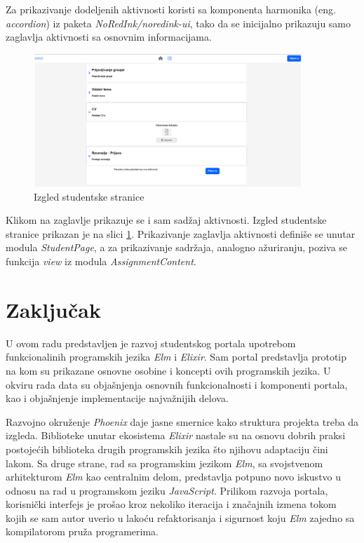 \documentclass[12pt,oneside]{memoir}
\begin{document}
Za prikazivanje dodeljenih aktivnosti koristi sa komponenta harmonika (eng. \emph{accordion}) iz paketa \emph{NoRedInk/noredink-ui},
tako da se inicijalno prikazuju samo zaglavlja aktivnosti sa osnovnim informacijama.
\begin{figure}[!ht]
  \centering
  \includegraphics[width=0.9\textwidth]{student-page.png}
  \caption{Izgled studentske stranice}
  \label{fig:student-page}
\end{figure}
Klikom na zaglavlje prikazuje se i sam sadžaj aktivnosti. Izgled studentske stranice prikazan je na slici \ref{fig:student-page}.
Prikazivanje zaglavlja aktivnosti definiše se unutar modula \emph{StudentPage}, a za prikazivanje sadržaja, analogno ažuriranju,
poziva se funkcija \emph{view} iz modula \emph{AssignmentContent}.

\chapter{Zaključak}
U ovom radu predstavljen je razvoj studentskog portala upotrebom funkcionalinih
programskih jezika \emph{Elm} i \emph{Elixir}. Sam portal predstavlja prototip na
kom su prikazane osnovne osobine i koncepti ovih programskih jezika. U okviru rada
data su objašnjenja osnovnih funkcionalnosti i komponenti portala, kao i
objašnjenje implementacije najvažnijih delova.

Razvojno okruženje \emph{Phoenix} daje jasne smernice kako struktura projekta treba
da izgleda. Biblioteke unutar ekosistema \emph{Elixir} nastale su na osnovu dobrih
praksi postojećih biblioteka drugih programskih jezika što njihovu adaptaciju
čini lakom. Sa druge strane, rad sa programskim jezikom \emph{Elm}, sa svojstvenom arhitekturom \emph{Elm}
kao centralnim delom, predstavlja potpuno novo iskustvo u odnosu na rad
u programskom jeziku \emph{JavaScript}. Prilikom razvoja portala, korisnički interfejs je prošao
kroz nekoliko iteracija i značajnih izmena tokom kojih se sam autor uverio u lakoću
refaktorisanja i sigurnost koju \emph{Elm} zajedno sa kompilatorom pruža programerima.
\end{document}
